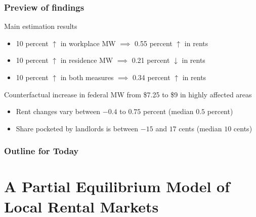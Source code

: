 \documentclass[aspectratio=169, t]{beamer}
\begin{document}
\begin{frame}
    \frametitle{Preview of findings}
    
    Main estimation results
    \begin{itemize}
        \vspace{1mm}
        \item 10 percent $\uparrow$ in {\color{red} workplace MW}
        $\implies$ 0.55 percent $\uparrow$ in rents
        \vspace{1mm}
        \item 10 percent $\uparrow$ in {\color{blue} residence MW}
        $\implies$ 0.21 percent $\downarrow$ in rents
        \vspace{1mm}
        \item 10 percent $\uparrow$ in both measures $\implies$ 0.34 percent $\uparrow$ in rents
    \end{itemize}
    
    \vspace{5mm}
    \pause
    Counterfactual increase in federal MW from \$7.25 to \$9 in highly affected areas
    \begin{itemize}
        \vspace{1mm}
        \item Rent changes vary between $-0.4$ to $0.75$ percent (median $0.5$ percent)
        \vspace{1mm}
        \item Share pocketed by landlords is between $-15$ and $17$ cents (median $10$ cents)
    \end{itemize}
\end{frame}

\begin{frame}
    \frametitle{Outline for Today}
    \tableofcontents[hideallsubsections]
\end{frame}

\section{A Partial Equilibrium Model of Local Rental Markets}
\end{document}
